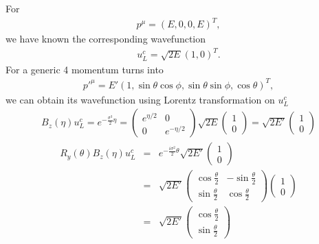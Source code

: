 \documentclass[11pt]{article}
\begin{document}
\section{ }
For
\begin{eqnarray}
    p^\mu = (E, 0, 0, E)^T,
\end{eqnarray}
we have known the corresponding wavefunction
\begin{eqnarray}
    u_L^c=\sqrt{2E} (1,0)^T.
\end{eqnarray}
For a generic 4 momentum turns into
\begin{eqnarray}
    {p'}^\mu
    = E' (1, \sin\theta\cos\phi, \sin\theta\sin\phi, \cos\theta)^T, 
\end{eqnarray}
we can obtain its wavefunction using Lorentz transformation on $u_L^c$
\begin{eqnarray}
    B_z(\eta)u_L^c=e^{-\frac{\sigma^3}{2} \eta}=
    \begin{pmatrix}
      e^{\eta/2} & 0 \\
      0 & e^{-\eta/2}
    \end{pmatrix}
    \sqrt{2E}
    \begin{pmatrix}
        1 \\ 0
    \end{pmatrix}
    =\sqrt{2E'}
    \begin{pmatrix}
        1 \\ 0
    \end{pmatrix}
\end{eqnarray}
\begin{eqnarray}
   R_y(\theta)B_z(\eta)u_L^c&=& e^{-\frac{i \sigma^2}{2} \theta}\sqrt{2E'}
   \begin{pmatrix}
    1 \\ 0
    \end{pmatrix}\\
    &=& \sqrt{2E'}
    \begin{pmatrix}
        \cos \frac{\theta}{2} & -\sin \frac{\theta}{2} \\
        \sin \frac{\theta}{2} & \cos \frac{\theta}{2}
    \end{pmatrix}
    \begin{pmatrix}
        1 \\ 0
    \end{pmatrix}\\
    &=&\sqrt{2E'}
    \begin{pmatrix}
        \cos\frac{\theta}{2} \\ \sin\frac{\theta}{2}
    \end{pmatrix}
\end{eqnarray}
\end{document}
